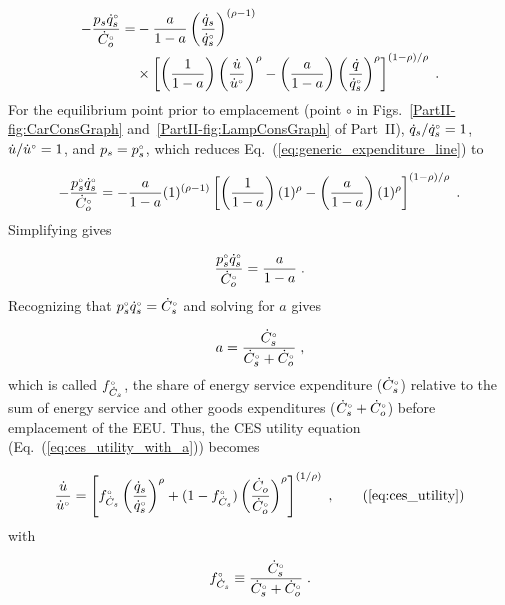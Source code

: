 \documentclass[12pt]{article}\usepackage[]{graphicx}\usepackage[]{xcolor}
\begin{document}
\begin{align} \label{eq:generic_expenditure_line}
  - \frac{p_s {}{\dot{q}}^{\scriptscriptstyle \circ}_s}{{}{\dot{C}}^{\scriptscriptstyle \circ}_o} =& 
        -\frac{a}{1 - a} \left( \frac{\dot{q}_s}{{}{\dot{q}}^{\scriptscriptstyle \circ}_s} \right)^{(\rho -1)} \nonumber \\
        &\times \left[ \left( \frac{1}{1 - a} \right) \left( \frac{\dot{u}}{{}{\dot{u}}^{\scriptscriptstyle \circ}} \right)^\rho
                - \left( \frac{a}{1 - a} \right) 
                          \left( \frac{\dot{q}}{{}{\dot{q}}^{\scriptscriptstyle \circ}_s} \right)^\rho \right]^{(1 - \rho)/\rho} \; .
\end{align}
%
For the equilibrium point 
prior to emplacement
(point $\circ$
in Figs.~\ref{PartII-fig:CarConsGraph} 
and~\ref{PartII-fig:LampConsGraph} of Part~II),
$\dot{q}_s/{}{\dot{q}}^{\scriptscriptstyle \circ}_s = 1$, $\dot{u}/{}{\dot{u}}^{\scriptscriptstyle \circ} = 1$, and
$p_s = {}{p}^{\scriptscriptstyle \circ}_s$, which reduces Eq.~(\ref{eq:generic_expenditure_line}) to

\begin{equation}
  - \frac{{}{p}^{\scriptscriptstyle \circ}_s {}{\dot{q}}^{\scriptscriptstyle \circ}_s}{{}{\dot{C}}^{\scriptscriptstyle \circ}_o} =
        -\frac{a}{1 - a} (1)^{(\rho -1)}
        \left[ \left( \frac{1}{1 - a} \right) (1)^\rho
                - \left( \frac{a}{1 - a} \right) 
                          (1)^\rho \right]^{(1 - \rho)/\rho} \; .
\end{equation}
%
Simplifying gives

\begin{equation}
  \frac{{}{p}^{\scriptscriptstyle \circ}_s {}{\dot{q}}^{\scriptscriptstyle \circ}_s}{{}{\dot{C}}^{\scriptscriptstyle \circ}_o} = \frac{a}{1 - a} \; .
\end{equation}
%
Recognizing that ${}{p}^{\scriptscriptstyle \circ}_s {}{\dot{q}}^{\scriptscriptstyle \circ}_s = {}{\dot{C}}^{\scriptscriptstyle \circ}_s$ and solving for
$a$ gives

\begin{equation}
  a = \frac{{}{\dot{C}}^{\scriptscriptstyle \circ}_s}{{}{\dot{C}}^{\scriptscriptstyle \circ}_s + {}{\dot{C}}^{\scriptscriptstyle \circ}_o} \; ,
\end{equation}
%
which is called ${}{f}^{\scriptscriptstyle \circ}_{\dot{C}_s}$, 
the share of energy service expenditure (${}{\dot{C}}^{\scriptscriptstyle \circ}_s$) 
relative to the sum of energy service and other goods expenditures 
(${}{\dot{C}}^{\scriptscriptstyle \circ}_s + {}{\dot{C}}^{\scriptscriptstyle \circ}_o$) 
before emplacement of the EEU.
Thus, the CES utility equation (Eq.~(\ref{eq:ces_utility_with_a})) becomes

\begin{equation} 
    \frac{\rate{u}}{\rbempl{u}} = \cesutility{} \; , \tag{\ref{eq:ces_utility}}
\end{equation}
%
with 

\begin{equation} \label{eq:fCs}
  {}{f}^{\scriptscriptstyle \circ}_{\dot{C}_s} \equiv \frac{{}{\dot{C}}^{\scriptscriptstyle \circ}_s}{{}{\dot{C}}^{\scriptscriptstyle \circ}_s + {}{\dot{C}}^{\scriptscriptstyle \circ}_o} \; .
\end{equation}
\end{document}
